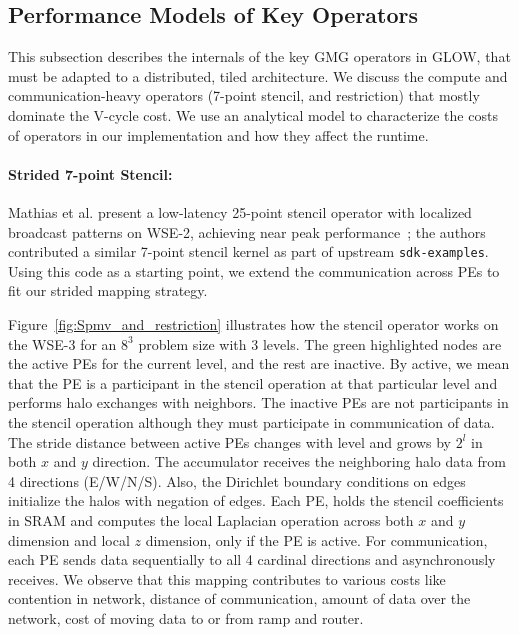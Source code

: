 \documentclass[conference]{IEEEtran}
\begin{document}
        \subsection{Performance Models of Key Operators}
            \label{sec:perfmodel}
            This subsection describes the internals of the key GMG operators in GLOW, that must be adapted to a distributed, tiled architecture. We discuss the compute and communication-heavy operators (7-point stencil, and restriction) that mostly dominate the V-cycle cost. We use an analytical model to characterize the costs of operators in our implementation and how they affect the runtime.

            \paragraph{Strided 7-point Stencil:}
            Mathias et al. present  %
            a low-latency 25-point stencil operator with localized broadcast patterns on WSE-2, achieving near peak performance~\cite{mathias}; the authors contributed a   similar 7-point stencil kernel as part of upstream \texttt{sdk-examples}.  Using this code as a starting point, we extend the communication across PEs to fit our strided mapping strategy.

            Figure~\ref{fig:Spmv_and_restriction} illustrates how the stencil operator works on the WSE-3 for an \(8^3\) problem size with 3 levels. %
            The green highlighted nodes are the active PEs for the current level, and the rest are inactive. By active, we mean that the PE is a participant in the stencil operation at that particular level and performs halo exchanges with neighbors. The inactive PEs are not participants in the stencil operation although they must participate in communication of data. The stride distance between active PEs changes with level and grows by \(2^l\) in both \(x\) and \(y\) direction.
            The accumulator receives the neighboring halo data from 4 directions (E/W/N/S).   Also, the Dirichlet boundary conditions on edges initialize the halos with negation of edges. Each PE, holds the stencil coefficients in SRAM and computes the local Laplacian operation across both \(x\) and \(y\) dimension and local \(z\) dimension, only if the PE is active. For communication, each PE sends data sequentially to all 4 cardinal directions and asynchronously receives. We observe that this mapping contributes to various costs like contention in network, distance of communication, amount of data over the network, cost of moving data to or from ramp and router.
\end{document}
